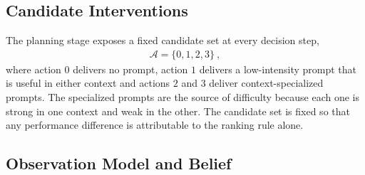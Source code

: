 \documentclass[journal]{IEEEtran}
\begin{document}
\subsection{Candidate Interventions}
\label{sec:actions}

The planning stage exposes a fixed candidate set at every decision step,
\begin{align}
\label{eq:actions}
\mathcal{A}=\{0,1,2,3\}\:,
\end{align}
where action \(0\) delivers no prompt, action \(1\) delivers a low-intensity prompt that is useful in either context and actions \(2\) and \(3\) deliver context-specialized prompts.
The specialized prompts are the source of difficulty because each one is strong in one context and weak in the other.
The candidate set is fixed so that any performance difference is attributable to the ranking rule alone.

\subsection{Observation Model and Belief}
\label{sec:belief}
\end{document}
